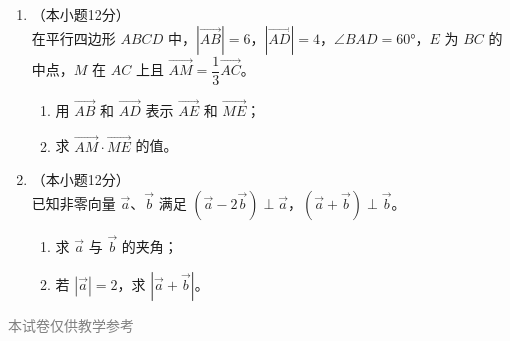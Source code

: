 \documentclass[12pt, a4paper]{ctexart}
\begin{document}
\begin{enumerate}[resume]
\item[21.]（本小题12分）\\
在平行四边形 $ABCD$ 中，$|\overrightarrow{AB}|=6$，$|\overrightarrow{AD}|=4$，$\angle BAD=60°$，$E$ 为 $BC$ 的中点，$M$ 在 $AC$ 上且 $\overrightarrow{AM}=\dfrac{1}{3}\overrightarrow{AC}$。
\begin{enumerate}[(1)]
  \item 用 $\overrightarrow{AB}$ 和 $\overrightarrow{AD}$ 表示 $\overrightarrow{AE}$ 和 $\overrightarrow{ME}$；
  \item 求 $\overrightarrow{AM}\cdot\overrightarrow{ME}$ 的值。
\end{enumerate}

\vspace{6cm}

\item[22.]（本小题12分）\\
已知非零向量 $\vec{a}$、$\vec{b}$ 满足 $(\vec{a}-2\vec{b})\perp\vec{a}$，$(\vec{a}+\vec{b})\perp\vec{b}$。
\begin{enumerate}[(1)]
  \item 求 $\vec{a}$ 与 $\vec{b}$ 的夹角；
  \item 若 $|\vec{a}|=2$，求 $|\vec{a}+\vec{b}|$。
\end{enumerate}

\vspace{6cm}
\end{enumerate}

\vfill
\begin{center}
\small\textcolor{gray}{本试卷仅供教学参考}
\end{center}
\end{document}
